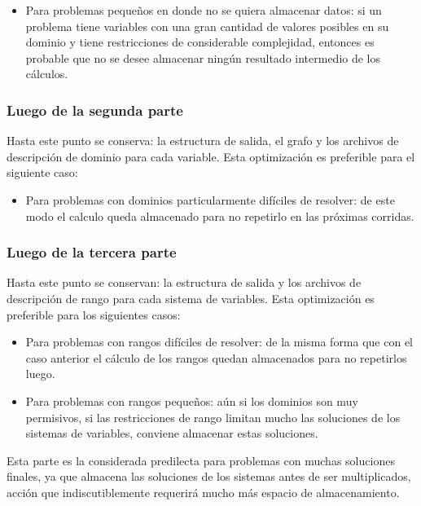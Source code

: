 \begin{itemize}
\item {Para problemas pequeños en donde no se quiera almacenar datos: si un 
problema tiene variables con una gran cantidad de valores posibles en su dominio
y tiene restricciones de considerable complejidad, entonces es probable que no
se desee almacenar ningún resultado intermedio de los cálculos.} 
\end{itemize} 


\subsubsection{Luego de la segunda parte}
Hasta este punto se conserva: la estructura de salida, el grafo y los archivos
de descripción de dominio para cada variable. Esta optimización es preferible para el 
siguiente caso:

\begin{itemize}
\item {Para problemas con dominios particularmente difíciles de resolver:
de este modo el calculo queda almacenado para no repetirlo en las próximas 
corridas.} 
\end{itemize}


\subsubsection{Luego de la tercera parte}
Hasta este punto se conservan: la estructura de salida y los archivos
de descripción de rango para cada sistema de variables. Esta optimización es preferible para los 
siguientes casos:

\begin{itemize}
\item {Para problemas con rangos difíciles de resolver:
de la misma forma que con el caso anterior el cálculo de los rangos quedan
almacenados para no repetirlos luego.} 

\item{Para problemas con rangos pequeños: aún si los dominios son muy
permisivos, si las restricciones de rango limitan mucho las soluciones
de los sistemas de variables, conviene almacenar estas soluciones.}
\end{itemize}

Esta parte es la considerada predilecta para problemas con muchas soluciones 
finales, ya que almacena las soluciones de los sistemas antes de ser
multiplicados, acción que indiscutiblemente requerirá mucho más espacio de 
almacenamiento.

